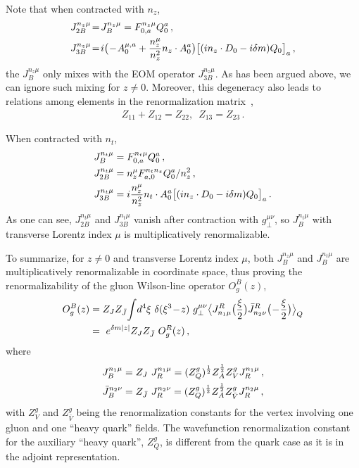 Note that when contracted with $n_z$,
\begin{align}
	J_{2B}^{n_z\mu}&\!=\! J_{B}^{n_z\mu} = F^{n_z\mu}_{0,a}Q_0^a\,,\\
	J_{3B}^{n_z\mu}&\!=\! i\big(\!-\!A^{\mu,a}_{0} + {n_z^\mu\over n_z^2} n_z\cdot A_0^a\big)\big[(in_z\cdot D_0-i\delta m)Q_0\big]_a\,,\nonumber
\end{align}
the $J_{B}^{n_z\mu}$ only mixes with the EOM operator $J_{3B}^{n_z\mu}$. As has been argued above, we can ignore such mixing for $z\neq0$.
Moreover, this degeneracy also leads to relations among elements in the renormalization matrix~\cite{Dorn:1986dt},
\begin{align}\label{eq:Zrelation}
	Z_{11}+Z_{12}=Z_{22}, \,\,\,  Z_{13}=Z_{23}\,.
\end{align}


When contracted with $n_t$,
\begin{align} \label{eq:gauxopt}
	J_{B}^{n_t\mu} &=F^{n_t\mu}_{0,a}Q_0^a\,,\nonumber\\
	J_{2B}^{n_t\mu} &=n_z^\mu F_{a,0}^{n_tn_z} Q_0^a/n_z^2\,,\nonumber\\
	J_{3B}^{n_t\mu}&= i{n_z^\mu\over n_z^2} n_t\cdot A_{0}^a \big[(in_z\cdot D_0-i\delta m)Q_0\big]_a\,.
\end{align}
As one can see, $J_{2B}^{n_t\mu}$ and $J_{3B}^{n_t\mu}$ vanish after contraction with $g_{\perp}^{\mu\nu}$, so $J_{B}^{n_t\mu}$ with transverse Lorentz index $\mu$ is multiplicatively renormalizable.

To summarize, for $z\neq0$ and transverse Lorentz index $\mu$, both $J_{B}^{n_z\mu}$ and $J_{B}^{n_t\mu}$ are multiplicatively renormalizable in coordinate space, thus proving the renormalizability of the gluon Wilson-line operator $O^B_g(z)$,
\begin{align} \label{eq:renproofgluon}
	O^B_g(z)&=Z_{J}Z_{\bar{J}}\!\int\! d^4\xi\ \delta(\xi^3\!-\!z)\ g_{\perp}^{\mu\nu}\big\langle J_{n_1\mu}^{R}\big({\xi\over2}\big)\bar{J}_{n_2\nu}^{R}\big(\!-\!{\xi\over2}\big)\big\rangle_Q\nn\\
	&=\ e^{\delta m|z|} Z_{J}Z_{\bar{J}}\ O^R_g(z)\,,
\end{align}
where
\begin{align}
	J_B^{n_1\mu}&=Z_{J}\ J_R^{n_1\mu}=(Z^g_Q)^{1\over 2}Z_A^{1\over 2}Z^g_V J_R^{n_1\mu}\,,\\
	\bar{J}_B^{n_2\nu}&=Z_{\bar{J}}\ J_R^{n_2\nu}=(Z^g_Q)^{1\over 2}Z_A^{1\over 2}Z^g_{\bar{V}} J_R^{n_2\mu}\,,
\end{align}
with $Z^g_V$ and $Z^g_{\bar{V}}$ being the renormalization constants for the vertex involving one gluon and one ``heavy quark'' fields. The wavefunction renormalization constant for the auxiliary ``heavy quark'', $Z^g_Q$, is different from the quark case as it is in the adjoint representation.

